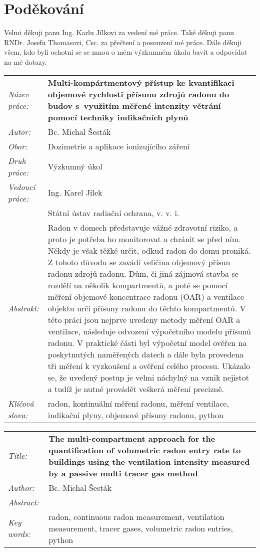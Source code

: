 \section*{Poděkování}
Velmi děkuji panu Ing. Karlu Jílkovi za vedení mé práce. Také děkuji panu RNDr. Josefu Thomasovi, Csc. za přečtení a posouzení mé práce. Dále děkuji všem, kdo byli ochotni se se mnou o mém výzkumném úkolu bavit a odpovídat na mé dotazy. 
\newpage
\begin{tabularx}{\textwidth}{>{\itshape}l X}
  Název práce: & \textbf{Multi-kompártmentový přístup ke kvantifikaci  objemové rychlosti přísunu zdrojů radonu do budov s využitím měřené intenzity větrání pomocí techniky indikačních plynů}\\
  Autor: & Bc. Michal Šesták\\
  Obor: & Dozimetrie a aplikace ionizujícího záření\\
  Druh práce: & Výzkumný úkol\\
  Vedoucí práce: & Ing. Karel Jílek\\ 
               & Státní ústav radiační ochrana, v. v. i.\\
  Abstrakt: & Radon v domech představuje vážné zdravotní riziko, a proto je potřeba ho monitorovat a chránit se před ním. Někdy je však těžké určit, odkud radon do domu proniká. Z tohoto důvodu se zavádí veličina objemový přísun radonu zdrojů radonu. Dům, či jiná zájmová stavba se rozdělí na několik kompartmentů, a poté se pomocí měření objemové koncentrace radonu (OAR) a ventilace objektu určí přísuny radonu do těchto kompartmentů. V této práci jsou nejprve uvedeny metody měření OAR a ventilace, následuje odvození výpočetního modelu přísunů radonu. V praktické části byl výpočetní model ověřen na poskytnutých naměřených datech a dále byla provedena tři měření k vyzkoušení a ověření celého procesu. Ukázalo se, že uvedený postup je velmi náchylný na vznik nejistot a tudíž
  je nutné provádět veškerá měření precizně.\\
  Klíčová slova: & radon, kontinuální měření radonu, měření ventilace, indikační plyny, objemové přísuny radonu, python  
\end{tabularx}
\newpage
\begin{tabularx}{\textwidth}{>{\itshape}l X}
  Title: & \textbf{The multi-compartment approach for the quantification of volumetric radon entry rate to buildings using the ventilation intensity measured by a passive multi tracer gas method}\\
  Author: & Bc. Michal Šesták\\
  Abstract: & \\
  Key words: & radon, continuous radon measurement, ventilation measurement, tracer gases, volumetric radon entries, python 
\end{tabularx}
\newpage 
